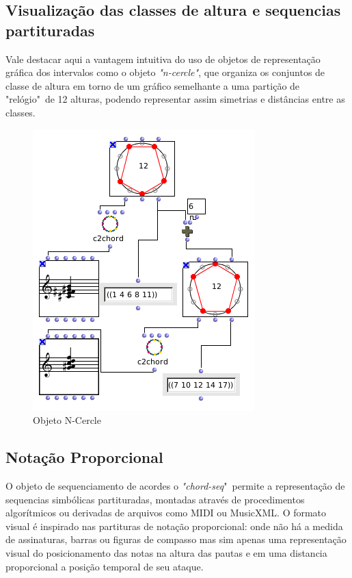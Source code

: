 \documentclass[
	12pt,				%
	openright,			%
	twoside,			%
	a4paper,			%
	english,			%
	french,				%
	spanish,			%
	brazil				%
	]{abntex2}
\begin{document}
\subsection{Visualização das classes de altura e sequencias partituradas}

Vale destacar aqui a vantagem intuitiva do uso de objetos de representação gráfica dos intervalos como o objeto \textit{"n-cercle"}, que organiza os conjuntos de classe de altura em torno de um gráfico semelhante a uma partição de "relógio"\ de 12 alturas, podendo representar assim simetrias e distâncias entre as classes.

\begin{figure}[!h]
	\caption{\label{fig_grafico}Objeto N-Cercle }
	\begin{center}
	    \includegraphics[scale=0.5]{estudosM21/ncercle.png}
	\end{center}
\end{figure}

\subsection{Notação Proporcional}

O objeto de sequenciamento de acordes o \textit{"chord-seq}"\ permite a representação de sequencias simbólicas partituradas, montadas através de procedimentos algorítmicos ou derivadas de arquivos como MIDI ou MusicXML. O formato visual é inspirado nas partituras de notação proporcional: onde não há a medida de assinaturas, barras ou figuras de compasso mas sim apenas uma representação visual do posicionamento das notas na altura das pautas e em uma distancia proporcional a posição temporal de seu ataque.
\end{document}
